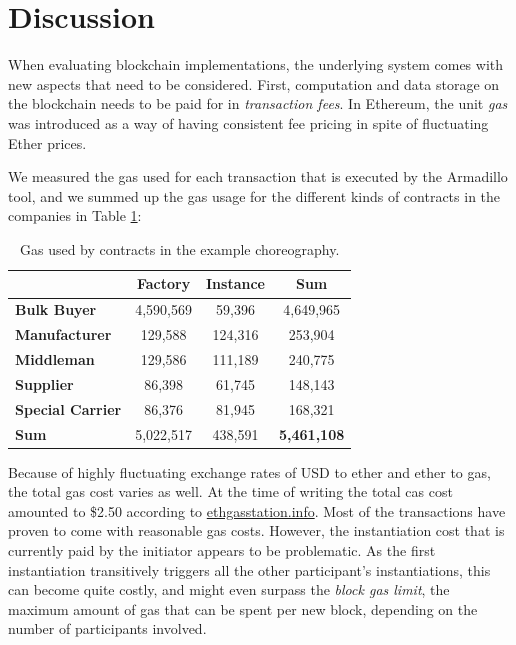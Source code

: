 \documentclass[runningheads]{llncs}
\begin{document}
\section{Discussion} \label{evaluation}

When evaluating blockchain implementations, the underlying system comes with new aspects that need to be considered.
First, computation and data storage on the blockchain needs to be paid for in \emph{transaction fees}.
In Ethereum, the unit \emph{gas} was introduced as a way of having consistent fee pricing in spite of fluctuating Ether prices.

We measured the gas used for each transaction that is executed by the Armadillo tool, and we summed up the gas usage for the different kinds of contracts in the companies in Table \ref{gasusage}:

\begin{table}
	\centering
	\caption{Gas used by contracts in the example choreography.} \label{gasusage}
	\begin{tabular}{|l | c | c | c|}
		\hline                          & \textbf{Factory} & \textbf{Instance} & \textbf{Sum}       \\
		\hline \textbf{Bulk Buyer}      & 4,590,569        & 59,396            & 4,649,965          \\
		\hline \textbf{Manufacturer}    & 129,588          & 124,316           & 253,904            \\
		\hline \textbf{Middleman}       & 129,586          & 111,189           & 240,775            \\
		\hline \textbf{Supplier}        & 86,398           & 61,745            & 148,143            \\
		\hline \textbf{Special Carrier} & 86,376           & 81,945            & 168,321            \\
		\hline \textbf{Sum}             & 5,022,517        & 438,591           & \textbf{5,461,108} \\ \hline
	\end{tabular}
\end{table}
Because of highly fluctuating exchange rates of USD to ether and ether to gas, the total gas cost varies as well. At the time of writing the total cas cost amounted to \$2.50 according to \url{ethgasstation.info}. 
Most of the transactions have proven to come with reasonable gas costs.
However, the instantiation cost that is currently paid by the initiator appears to be problematic.
As the first instantiation transitively triggers all the other participant's instantiations, this can become quite costly, and might even surpass the \emph{block gas limit}, the maximum amount of gas that can be spent per new block, depending on the number of participants involved.
\end{document}
